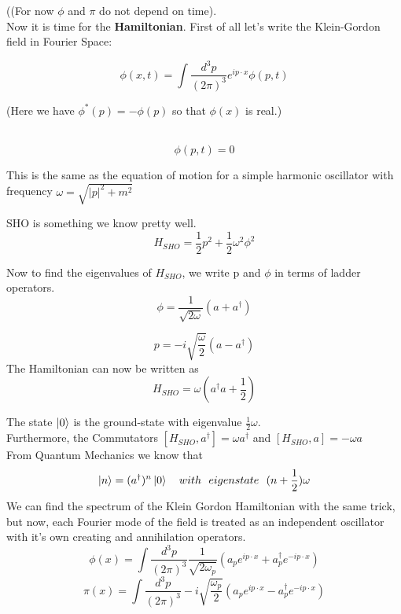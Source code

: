 \documentclass{article}
\newcommand{\Bb}[1]{\begin{tcolorbox}[colframe=blue!50!white]
{#1}
\end{tcolorbox}}
\newcommand{\dd}{\dagger}
\newcommand{\A}{a^\dagger}
\begin{document}
 ((For now $\phi$ and $\pi$ do not depend on time).
 \\
 Now it is time for the \textbf{Hamiltonian}. First of all let's write the Klein-Gordon field in Fourier Space:
 
 \begin{equation}
     \phi(x,t) = \int\frac{d^3 p}{(2\pi)^3} e^{ip\cdot x}\phi(p,t)
 \end{equation}
 
 (Here we have $\phi^*(p) = -\phi(p)$ so that $\phi(x)$ is real.)
 \\
\Bb{ 
 \\ 
 
 \begin{equation}
     [\frac{\partial^2 }{\partial t^2} + (\vert p\vert^2 +m^2) ]\phi(p,t) = 0
 \end{equation}}
 
 This is the same as the equation of motion for a simple harmonic oscillator with frequency $\omega = \sqrt{|p|^2 + m^2}$
 
 SHO is something we know pretty well.
 \begin{equation}
     H_{SHO} = \frac{1}{2}p^2 + \frac{1}{2}\omega^2 \phi^2
 \end{equation}

Now to find the eigenvalues of $H_{SHO}$, we write p and $\phi$ in terms of ladder operators.
\\
\begin{equation}
    \phi = \frac{1}{\sqrt{2\omega}}(a + a^{\dd})
\end{equation}

\begin{equation}
    p = -i\sqrt{\frac{\omega}{2}}(a - a^{\dd})
\end{equation}
The Hamiltonian can now be written as 
\begin{equation}
    H_{SHO}= \omega(a^\dd a + \frac{1}{2})
\end{equation}

The state $\ket{0}$ is the ground-state with eigenvalue $\frac{1}{2}\omega$.
\\
Furthermore, the Commutators $[H_{SHO},a^\dd] = \omega a^\dd$ and $[H_{SHO},a] = -\omega a$
\\
From Quantum Mechanics we know that 
\begin{equation}
    \ket{n} = (a^\dd)^n\ket{0}\ \ \ with \ \ eigenstate \ \ (n+\frac{1}{2})\omega
\end{equation}
We can find the spectrum of the Klein Gordon Hamiltonian with the same trick, but now, each Fourier mode of the field is treated as an independent oscillator with it's own creating and annihilation operators.
\\
\begin{equation}
    \phi(x) = \int \frac{d^3 p }{(2\pi)^3} \frac{1}{\sqrt{2\omega_p}}(a_p e^{ip\cdot x} + \A_p e^{-ip\cdot x})
\end{equation}
\begin{equation}
    \pi(x) = \int \frac{d^3 p }{(2\pi)^3} -i\sqrt{\frac{\omega_p}{2}}(a_p e^{ip\cdot x} - \A_p e^{-ip\cdot x})
\end{equation}
\end{document}
